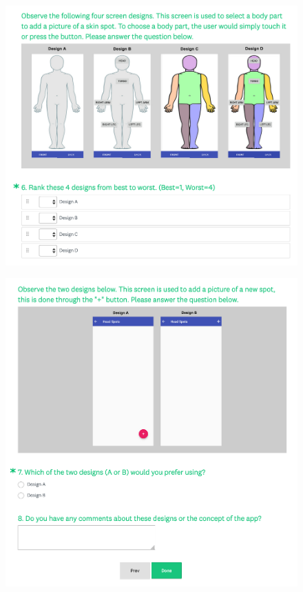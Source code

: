 \begin{figure}[H]
    \includegraphics[width=1.2\textwidth, center]{figures/survey6.png}
\end{figure}
\begin{figure}[H]
    \includegraphics[width=1.2\textwidth, center]{figures/survey7-8.png}
\end{figure}



